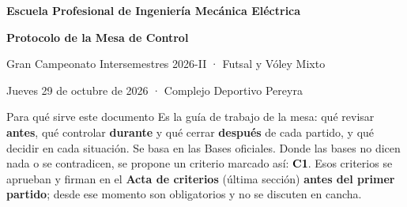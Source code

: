 


\fancyhead[L]{\small\textcolor{imegray}{Protocolo de la Mesa de Control}}
\fancyhead[R]{\small\textcolor{imegray}{Intersemestres 2026-II}}

\newcommand{\crit}[1]{\hspace{1pt}\colorbox{imegold}{\scriptsize\bfseries\textcolor{black}{C#1}}}
\newcommand{\casilla}{\fbox{\rule{0pt}{5pt}\hspace{5pt}}}
\newcommand{\linea}[1]{\rule{#1}{0.4pt}}



\thispagestyle{empty}
\begin{center}
	\vspace*{0.3cm}
	\logoCarrera\par\vspace{0.3cm}
	{\large\textbf{\textcolor{imedark}{Escuela Profesional de Ingeniería Mecánica Eléctrica}}\par}
	\vspace{0.4cm}
	{\Huge\textbf{\textcolor{imedark}{Protocolo de la Mesa de Control}}\par}
	\vspace{0.15cm}
	{\Large\textcolor{imegreenDark}{Gran Campeonato Intersemestres 2026-II · Futsal y Vóley Mixto}\par}
	\vspace{0.15cm}
	{\large Jueves 29 de octubre de 2026 · Complejo Deportivo Pereyra\par}
\end{center}

\begin{cajaResumen}{Para qué sirve este documento}
	Es la guía de trabajo de la mesa: qué revisar \textbf{antes}, qué controlar \textbf{durante} y qué cerrar \textbf{después} de cada partido, y qué decidir en cada situación. Se basa en las Bases oficiales. Donde las bases no dicen nada o se contradicen, se propone un criterio marcado así: \crit{1}. Esos criterios se aprueban y firman en el \textbf{Acta de criterios} (última sección) \textbf{antes del primer partido}; desde ese momento son obligatorios y no se discuten en cancha.
\end{cajaResumen}


